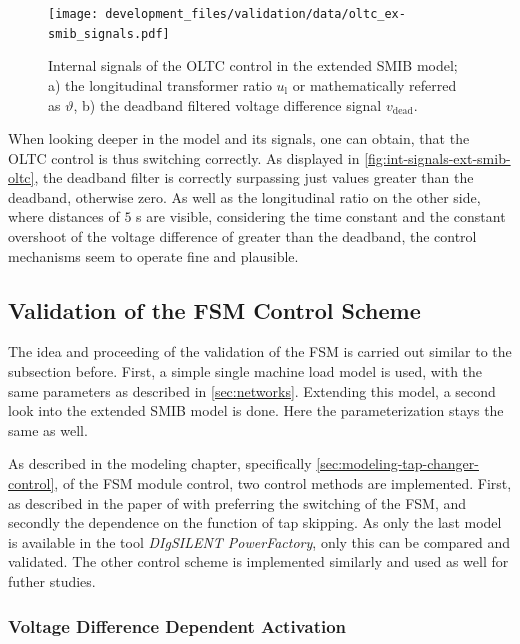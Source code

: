 \begin{figure}[htbp!]
    \centering
    \texttt{[image: development\_files/validation/data/oltc\_ex-smib\_signals.pdf]}
    \caption[Internal signals of the \acs{OLTC} control in the extended \acs{SMIB} model]{Internal signals of the \acs{OLTC} control in the extended \acs{SMIB} model; a) the longitudinal transformer ratio $u_\mathrm{l}$ or mathematically referred as $\vartheta$, b) the deadband filtered voltage difference signal $v_\mathrm{dead}$.}
    \label{fig:int-signals-ext-smib-oltc}
\end{figure}

When looking deeper in the model and its signals, one can obtain, that the \acs{OLTC} control is thus switching correctly.
As displayed in \autoref{fig:int-signals-ext-smib-oltc}, the deadband filter is correctly surpassing just values greater than the deadband, otherwise zero.
As well as the longitudinal ratio on the other side, where distances of $5$ s are visible, considering the time constant and the constant overshoot of the voltage difference of greater than the deadband, the control mechanisms seem to operate fine and plausible.

\subsection{Validation of the FSM Control Scheme}
\label{sec:validation-fsm-schemes}

The idea and proceeding of the validation of the \acs{FSM} is carried out similar to the subsection before.
First, a simple single machine load model is used, with the same parameters as described in \autoref{sec:networks}.
Extending this model, a second look into the extended \acs{SMIB} model is done.
Here the parameterization stays the same as well.

As described in the modeling chapter, specifically \autoref{sec:modeling-tap-changer-control}, of the \acs{FSM} module control, two control methods are implemented.
First, as described in the paper of \textcite{burlakin_2024} with preferring the switching of the \acs{FSM}, and secondly the dependence on the function of tap skipping.
As only the last model is available in the tool \textit{DIgSILENT PowerFactory}, only this can be compared and validated. 
The other control scheme is implemented similarly and used as well for futher studies.

\subsubsection{Voltage Difference Dependent Activation}

